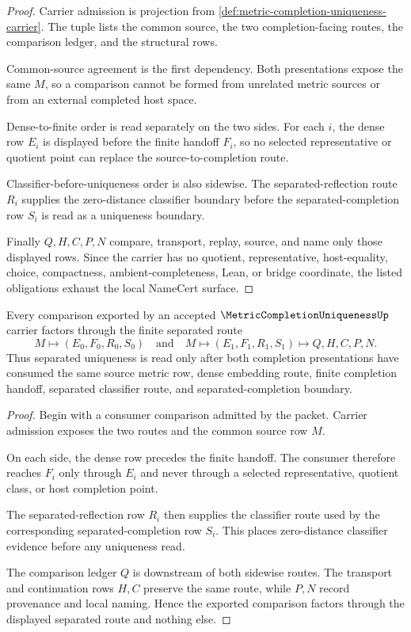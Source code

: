 \begin{proof}
Carrier admission is projection from \autoref{def:metric-completion-uniqueness-carrier}. The tuple lists the common source, the two completion-facing routes, the comparison ledger, and the structural rows.

Common-source agreement is the first dependency. Both presentations expose the same $M$, so a comparison cannot be formed from unrelated metric sources or from an external completed host space.

Dense-to-finite order is read separately on the two sides. For each $i$, the dense row $E_i$ is displayed before the finite handoff $F_i$, so no selected representative or quotient point can replace the source-to-completion route.

Classifier-before-uniqueness order is also sidewise. The separated-reflection route $R_i$ supplies the zero-distance classifier boundary before the separated-completion row $S_i$ is read as a uniqueness boundary.

Finally $Q,H,C,P,N$ compare, transport, replay, source, and name only those displayed rows. Since the carrier has no quotient, representative, host-equality, choice, compactness, ambient-completeness, Lean, or bridge coordinate, the listed obligations exhaust the local NameCert surface.
\end{proof}

\begin{theorem}
\label{thm:metric-completion-uniqueness-separated-route}
Every comparison exported by an accepted $\MetricCompletionUniquenessUp$ carrier factors through the finite separated route
$$
M\longmapsto (E_0,F_0,R_0,S_0)\quad\text{and}\quad M\longmapsto(E_1,F_1,R_1,S_1)\longmapsto Q,H,C,P,N .
$$
Thus separated uniqueness is read only after both completion presentations have consumed the same source metric row, dense embedding route, finite completion handoff, separated classifier route, and separated-completion boundary.
\end{theorem}
\begin{proof}
Begin with a consumer comparison admitted by the packet. Carrier admission exposes the two routes and the common source row $M$.

On each side, the dense row precedes the finite handoff. The consumer therefore reaches $F_i$ only through $E_i$ and never through a selected representative, quotient class, or host completion point.

The separated-reflection row $R_i$ then supplies the classifier route used by the corresponding separated-completion row $S_i$. This places zero-distance classifier evidence before any uniqueness read.

The comparison ledger $Q$ is downstream of both sidewise routes. The transport and continuation rows $H,C$ preserve the same route, while $P,N$ record provenance and local naming. Hence the exported comparison factors through the displayed separated route and nothing else.
\end{proof}

